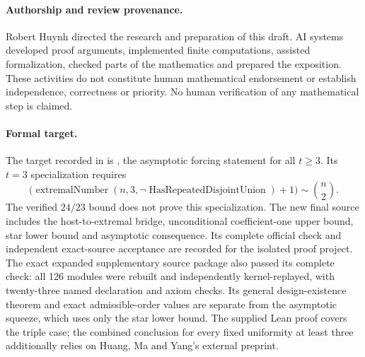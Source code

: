 \paragraph{Authorship and review provenance.}
Robert Huynh directed the research and preparation of this draft. AI systems developed proof arguments, implemented finite computations, assisted formalization, checked parts of the mathematics and prepared the exposition. These activities do not constitute human mathematical endorsement or establish independence, correctness or priority. No human verification of any mathematical step is claimed.

\paragraph{Formal target.}
The target recorded in  is , the asymptotic forcing statement for all $t\ge3$. Its $t=3$ specialization requires
\[
 \bigl(\operatorname{extremalNumber}(n,3,\neg\operatorname{HasRepeatedDisjointUnion})+1\bigr)
 \sim\binom n2.
\]
The verified $24/23$ bound does not prove this specialization. The new final source includes the host-to-extremal bridge, unconditional coefficient-one upper bound, star lower bound and asymptotic consequence. Its complete official check and independent exact-source acceptance are recorded for the isolated proof project. The exact expanded supplementary source package also passed its complete check: all 126 modules were rebuilt and independently kernel-replayed, with twenty-three named declaration and axiom checks. Its general design-existence theorem and exact admissible-order values are separate from the asymptotic squeeze, which uses only the star lower bound. The supplied Lean proof covers the triple case; the combined conclusion for every fixed uniformity at least three additionally relies on Huang, Ma and Yang's external preprint.
